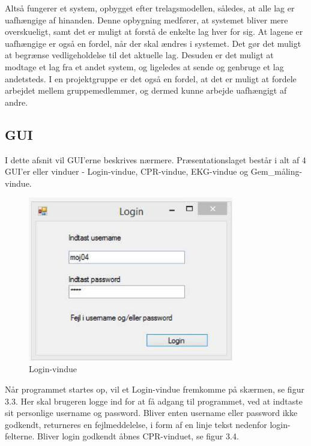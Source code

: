 Altså fungerer et system, opbygget efter trelagsmodellen, således, at alle lag er uafhængige af hinanden. Denne opbygning medfører, at systemet bliver mere overskueligt, samt det er muligt at forstå de enkelte lag hver for sig. At lagene er uafhængige er også en fordel, når der skal ændres i systemet. Det gør det muligt at begrænse vedligeholdelse til det aktuelle lag. Desuden er det muligt at modtage et lag fra et andet system, og ligeledes at sende og genbruge et lag andetsteds. I en projektgruppe er det også en fordel, at det er muligt at fordele arbejdet mellem gruppemedlemmer, og dermed kunne arbejde uafhængigt af andre.

\subsection{GUI}
I dette afsnit vil GUI’erne beskrives nærmere. Præsentationslaget består i alt af 4 GUI’er eller vinduer - Login-vindue, CPR-vindue, EKG-vindue og Gem\_måling-vindue.

\begin{figure}[H]
	\centering
	\includegraphics[width=0.8\textwidth]{Figurer/Snip20150430_38}
	\caption{Login-vindue}
\end{figure}

Når programmet startes op, vil et Login-vindue fremkomme på skærmen, se figur 3.3. Her skal brugeren logge ind for at få adgang til programmet, ved at indtaste sit personlige username og password. Bliver enten username eller password ikke godkendt, returneres en fejlmeddelelse, i form af en linje tekst nedenfor login-felterne. Bliver login godkendt åbnes CPR-vinduet, se figur 3.4.

